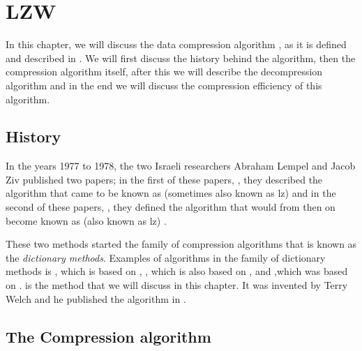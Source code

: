 \begin{comment}
  
\end{comment}

\chapter{LZW}
\label{cha:lzw}

In this chapter, we will discuss the data compression algorithm \lzw,
as it is defined and described in
\cite{Nelson:1989:LDC:77102.77104,Welch:1984:THD:1319729.1320134,Salomon:2004:DCC,mark1996data_compression_book,nelson:_lzw_revis}. We
will first discuss the history behind the algorithm, then the
compression algorithm itself, after this we will describe the
decompression algorithm and in the end we will discuss the compression
efficiency of this algorithm.

\section{History}
\label{sec:hist-lzw}

\newcommand*{\lzonev}{{\acronymstyle lz\oldstylenums{1}}\xspace}
\newcommand*{\lztwov}{{\acronymstyle lz\oldstylenums{2}}\xspace}

In the years 1977 to 1978, the two Israeli researchers Abraham Lempel
and Jacob Ziv published two papers; in the first of these papers,
\cite{Ziv77auniversal}, they described the algorithm that came to be
known as \lzone(sometimes also known as \lzonev) and in the second of
these papers, \cite{Ziv78compressionof}, they defined the algorithm
that would from then on become known as \lztwo(also known as \lztwov)
\cite{roelofs09:_histor_portab_networ_graph_png_format,Salomon:2004:DCC,winters:_us_paten_adapt}.

These two methods started the family of compression algorithms that is
known as the \textit{dictionary methods}. Examples of algorithms in
the family of dictionary methods is \lzma, which is based on \lztwo
\cite{palov11}, \lzw, which is also based on \lztwo, and \lzss,which
was based on \lzone \cite{Salomon:2004:DCC}. \lzw is the method that
we will discuss in this chapter. It was invented by Terry Welch and he
published the algorithm in \cite{welch85:_u}.

\section{The Compression algorithm}
\label{sec:lzw-comp-desc}

